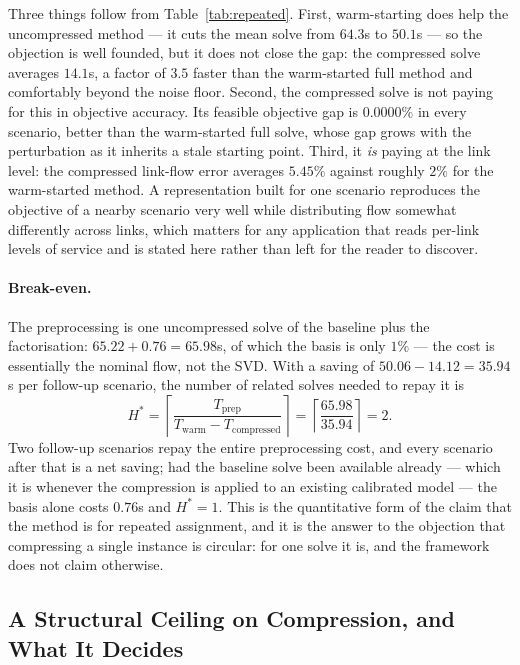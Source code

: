 \documentclass[11pt]{article}
\begin{document}
Three things follow from Table~\ref{tab:repeated}. First, warm-starting does help the
uncompressed method --- it cuts the mean solve from $64.3$s to $50.1$s --- so the objection is
well founded, but it does not close the gap: the compressed solve averages $14.1$s, a factor of
$3.5$ faster than the warm-started full method and comfortably beyond the noise floor. Second,
the compressed solve is not paying for this in objective accuracy. Its feasible objective gap
is $0.0000\%$ in every scenario, better than the warm-started full solve, whose gap grows with
the perturbation as it inherits a stale starting point. Third, it \emph{is} paying at the link
level: the compressed link-flow error averages $5.45\%$ against roughly $2\%$ for the
warm-started method. A representation built for one scenario reproduces the objective of a
nearby scenario very well while distributing flow somewhat differently across links, which
matters for any application that reads per-link levels of service and is stated here rather
than left for the reader to discover.

\paragraph{Break-even.} The preprocessing is one uncompressed solve of the baseline plus the
factorisation: $65.22 + 0.76 = 65.98$s, of which the basis is only $1\%$ --- the cost is
essentially the nominal flow, not the SVD. With a saving of $50.06 - 14.12 = 35.94$s per
follow-up scenario, the number of related solves needed to repay it is
\begin{equation}
\label{eq:breakeven}
H^\ast=\left\lceil\frac{T_{\text{prep}}}{T_{\text{warm}}-T_{\text{compressed}}}\right\rceil
=\left\lceil\frac{65.98}{35.94}\right\rceil=2 .
\end{equation}
Two follow-up scenarios repay the entire preprocessing cost, and every scenario after that is
a net saving; had the baseline solve been available already --- which it is whenever the
compression is applied to an existing calibrated model --- the basis alone costs $0.76$s and
$H^\ast=1$. This is the quantitative form of the claim that the method is for repeated
assignment, and it is the answer to the objection that compressing a single instance is
circular: for one solve it is, and the framework does not claim otherwise.

\subsection{A Structural Ceiling on Compression, and What It Decides}
\label{sec:ceiling}
\end{document}
